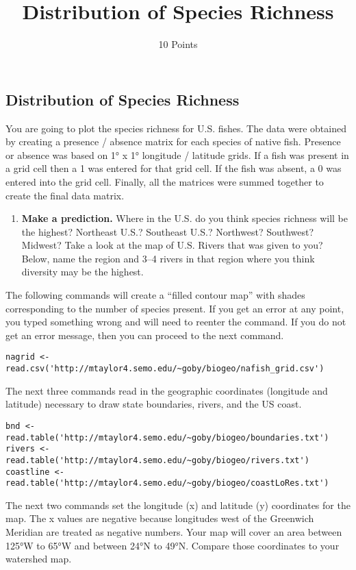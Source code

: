 \documentclass[11pt]{article}
\title{Distribution of Species Richness}
\author{10 Points}
\date{}                                           %
\begin{document}
\thispagestyle{plain}

\subsection*{Distribution of Species Richness}

You are going to plot the species richness for U.S. fishes. The data were
obtained by creating a presence / absence matrix for each species of
native fish. Presence or absence was based on 1° x 1° longitude /
latitude grids. If a fish was present in a grid cell then a 1 was
entered for that grid cell. If the fish was absent, a 0 was entered into
the grid cell. Finally, all the matrices were summed together to create
the final data matrix.

\begin{enumerate}[leftmargin=*]
\item \textbf{Make a prediction.} Where in the U.S. 
do you think species richness will be the highest? Northeast U.S.? Southeast
U.S.? Northwest? Southwest? Midwest? Take a look at the map of U.S. 
Rivers that was given to you?  Below, name the region and 3--4 rivers in that 
region where you think diversity may be the highest.\vspace{10\baselineskip}
\end{enumerate}

The following commands will create a ``filled contour map'' with shades
corresponding to the number of species present. If you get an error at
any point, you typed something wrong and will need to reenter the
command. If you do not get an error message, then you can proceed to the
next command.

\begin{verbatim}
nagrid <- read.csv('http://mtaylor4.semo.edu/~goby/biogeo/nafish_grid.csv')
\end{verbatim}

The next three commands read in the geographic coordinates (longitude
and latitude) necessary to draw state boundaries, rivers, and the US
coast.

\begin{verbatim}
bnd <- read.table('http://mtaylor4.semo.edu/~goby/biogeo/boundaries.txt')
rivers <- read.table('http://mtaylor4.semo.edu/~goby/biogeo/rivers.txt')
coastline <- read.table('http://mtaylor4.semo.edu/~goby/biogeo/coastLoRes.txt')
\end{verbatim}

The next two commands set the longitude (x) and latitude (y) coordinates
for the map. The x values are negative because longitudes west of the
Greenwich Meridian are treated as negative numbers. Your map will cover
an area between 125°W to 65°W and between 24°N to 49°N. Compare those
coordinates to your watershed map.
\end{document}
